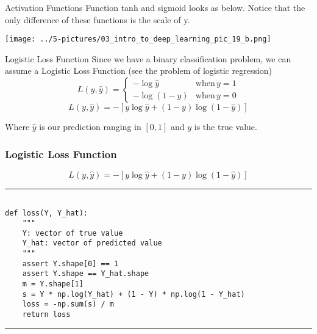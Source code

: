 \documentclass[11pt]{beamer}
\newcommand{\highlight}[1]{%
  \colorbox{yellow!100}{$\displaystyle#1$}}
\begin{document}
\begin{frame}{Activation Functions}
Function tanh and sigmoid looks as below. Notice that the only difference of these functions is the scale of y.
	\begin{center}
	\texttt{[image: ../5-pictures/03\_intro\_to\_deep\_learning\_pic\_19\_b.png]}
	\end{center}
\end{frame}
\begin{frame}{Logistic Loss Function}
Since we have a binary classification problem, we can assume a Logistic Loss Function (see the problem of logistic regression)
\begin{equation}
L(y, \hat{y}) = 
\begin{cases} 
-\log{\hat{y}} & \text{when}\, y = 1 \\ -\log(1 - \hat{y}) & \text{when}\, y = 0 
\end{cases} 
\end{equation}
$$ L(y, \hat{y}) = -[y\log{\hat{y}} + (1 - y)\log{(1 - \hat{y})}] $$

Where $\hat y$ is our \highlight{\text{prediction}} ranging in $[0, 1]$ and $y$ is the \highlight{\text{true}} value. 

\end{frame}
\begin{frame}[fragile]
\frametitle{Logistic Loss Function}

$$ L(y, \hat{y}) = -[y\log{\hat{y}} + (1 - y)\log{(1 - \hat{y})}] $$

\rule{\textwidth}{1pt}
\scriptsize
\begin{verbatim}

def loss(Y, Y_hat):
    """
    Y: vector of true value
    Y_hat: vector of predicted value
    """
    assert Y.shape[0] == 1
    assert Y.shape == Y_hat.shape
    m = Y.shape[1]
    s = Y * np.log(Y_hat) + (1 - Y) * np.log(1 - Y_hat)
    loss = -np.sum(s) / m
    return loss

\end{verbatim}
\rule{\textwidth}{1pt}
\end{frame}
\end{document}
